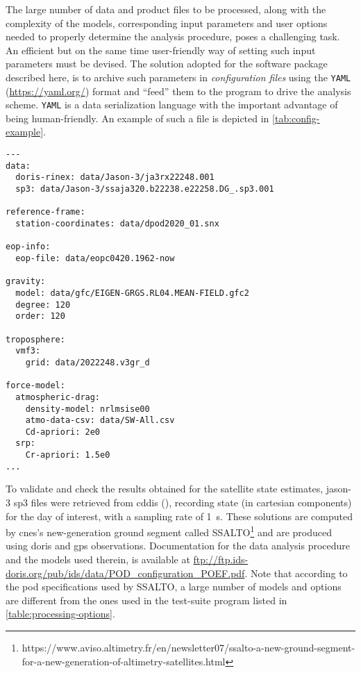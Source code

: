 The large number of data and product files to be processed, along with the complexity of 
the models, corresponding input parameters and user options needed to properly determine 
the analysis procedure, poses a challenging task. An efficient but on the same time 
user-friendly way of setting such input parameters must be devised. The solution adopted 
for the software package described here, is to archive such parameters in \emph{configuration files} 
using the \texttt{YAML} (\url{https://yaml.org/}) format and ``feed'' them to the 
program to drive the analysis scheme. \texttt{YAML} is a data serialization
language with the important advantage of being human-friendly. An example of such 
a file is depicted in \autoref{tab:config-example}.

\begin{adjustbox}{center, max width=\linewidth , fbox=0.5pt, captionbelow={Configuration file example.}, float=table}
\begin{BVerbatim}
---
data:
  doris-rinex: data/Jason-3/ja3rx22248.001
  sp3: data/Jason-3/ssaja320.b22238.e22258.DG_.sp3.001

reference-frame:
  station-coordinates: data/dpod2020_01.snx

eop-info:
  eop-file: data/eopc0420.1962-now

gravity:
  model: data/gfc/EIGEN-GRGS.RL04.MEAN-FIELD.gfc2
  degree: 120
  order: 120

troposphere:
  vmf3:
    grid: data/2022248.v3gr_d

force-model:
  atmospheric-drag:
    density-model: nrlmsise00
    atmo-data-csv: data/SW-All.csv
    Cd-apriori: 2e0
  srp:
    Cr-apriori: 1.5e0
...
\end{BVerbatim}
\label{tab:config-example}
\end{adjustbox}

To validate and check the results obtained for the satellite state estimates, 
\gls{jason}-3 sp3 files were retrieved from \gls{cddis} (\cite{Noll2010}), recording 
state (in cartesian components) for the day of interest, with a sampling rate of 
\SI{1}{\second}. These solutions are computed by \gls{cnes}'s new-generation ground segment 
called SSALTO\footnote{https://www.aviso.altimetry.fr/en/newsletter07/ssalto-a-new-ground-segment-for-a-new-generation-of-altimetry-satellites.html} 
and are produced using \gls{doris} and \gls{gps} observations. Documentation 
for the data analysis procedure and the models used therein, is available at 
\url{ftp://ftp.ids-doris.org/pub/ids/data/POD_configuration_POEF.pdf}. Note that 
according to the \gls{pod} specifications used by SSALTO, a large number of models 
and options are different from the ones used in the test-suite program listed in 
\autoref{table:processing-options}.

